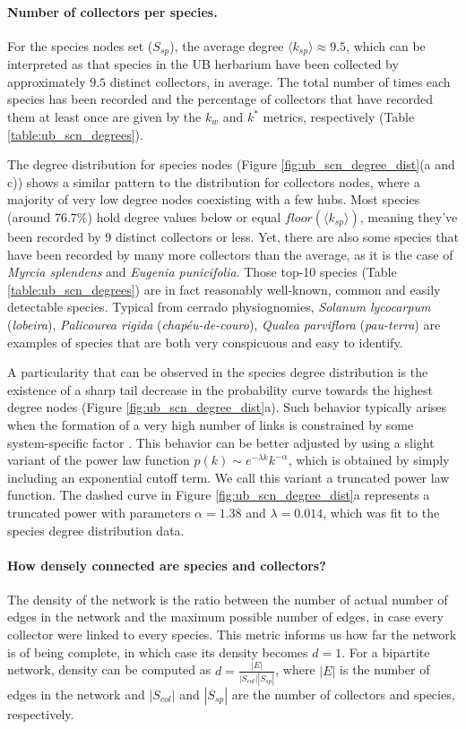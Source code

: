 \paragraph*{Number of collectors per species.}
For the species nodes set ($S_{sp}$), the average degree $\langle k_{sp}\rangle \approx 9.5$, which can be interpreted as that species in the UB herbarium have been collected by approximately $9.5$ distinct collectors, in average. 
The total number of times each species has been recorded and the percentage of collectors that have recorded them at least once are given by the $k_w$ and $k^*$ metrics, respectively (Table \ref{table:ub_scn_degrees}).

The degree distribution for species nodes (Figure \ref{fig:ub_scn_degree_dist}(a and c)) shows a similar pattern to the distribution for collectors nodes, where a majority of very low degree nodes coexisting with a few hubs.
Most species (around $76.7\%$) hold degree values below or equal $floor(\langle k_{sp}\rangle)$, meaning they've been recorded by $9$ distinct collectors or less.
Yet, there are also some species that have been recorded by many more collectors than the average, as it is the case of \textit{Myrcia splendens} and \textit{Eugenia punicifolia}. Those top-10 species (Table \ref{table:ub_scn_degrees}) are in fact reasonably well-known, common and easily detectable species. Typical from cerrado physiognomies, \textit{Solanum lycocarpum} (\textit{lobeira}), \textit{Palicourea rigida} (\textit{chapéu-de-couro}), \textit{Qualea parviflora} (\textit{pau-terra}) are examples of species that are both very conspicuous and easy to identify.

A particularity that can be observed in the species degree distribution is the existence of a sharp tail decrease in the probability curve towards the highest degree nodes (Figure \ref{fig:ub_scn_degree_dist}a). Such behavior typically arises when the formation of a very high number of links is constrained by some system-specific factor \cite{Newman}.
This behavior can be better adjusted by using a slight variant of the power law function $p(k) \sim e^{-\lambda k} k^{-\alpha}$, which is obtained by simply including an exponential cutoff term. We call this variant a truncated power law function. The dashed curve in Figure \ref{fig:ub_scn_degree_dist}a represents a truncated power with parameters $\alpha=1.38$ and $\lambda =0.014$, which was fit to the species degree distribution data.


\paragraph*{How densely connected are species and collectors?}
The density of the network is the ratio between the number of actual number of edges in the network and the maximum possible number of edges, in case every collector were linked to every species. This metric informs us how far the network is of being complete, in which case its density becomes $d=1$. For a bipartite network, density can be computed as $d = \frac{|E|}{|S_{col}| |S_{sp}|}$, where $|E|$ is the number of edges in the network and $|S_{col}|$ and $|S_{sp}|$ are the number of collectors and species, respectively.

